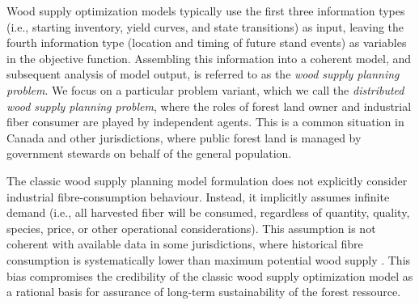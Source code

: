 Wood supply optimization models typically use the first three information types (i.e., starting inventory, yield curves, and state transitions) as input, leaving the fourth information type (location and timing of future stand events) as variables in the objective function. 
Assembling this information into a coherent model, and subsequent analysis of model output, is referred to as the \emph{wood supply planning problem}. 
We focus on a particular problem variant, which we call the \emph{distributed wood supply planning problem}, where the roles of forest land owner and industrial fiber consumer are played by independent agents. 
This is a common situation in Canada and other jurisdictions, where public forest land is managed by government stewards on behalf of the general population.



The classic wood supply planning model formulation 
does not explicitly consider industrial fibre-consumption behaviour. Instead, it implicitly assumes infinite demand (i.e., all harvested fiber will be consumed, regardless of quantity, quality, species, price, or other operational considerations). This assumption is not coherent with available data in some jurisdictions, where historical fibre consumption is systematically lower than maximum potential wood supply \citep{ccfm2005wood}.  This bias compromises the credibility of the classic wood supply optimization model as a rational basis for assurance of long-term sustainability of the forest ressource.

